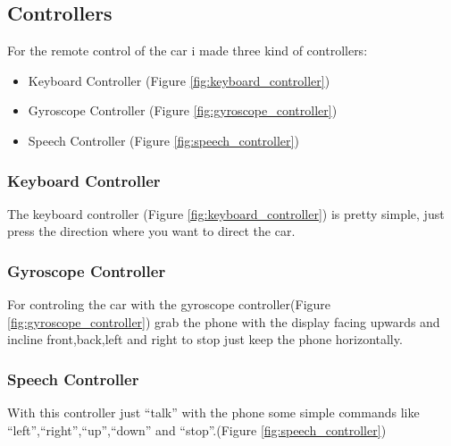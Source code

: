 \subsection{Controllers}
For the remote control of the car i made three kind of controllers:
\begin{itemize}
  \item Keyboard Controller (Figure \ref{fig:keyboard_controller})
  \item Gyroscope Controller (Figure \ref{fig:gyroscope_controller}) 
  \item Speech Controller (Figure \ref{fig:speech_controller})
\end{itemize}
\subsubsection{Keyboard Controller}
The keyboard controller (Figure \ref{fig:keyboard_controller}) is pretty simple, just press the direction where you want to direct the car.

\subsubsection{Gyroscope Controller}
For controling the car with the gyroscope controller(Figure \ref{fig:gyroscope_controller}) grab the phone with the display facing upwards and incline front,back,left and right to stop just keep the phone horizontally. 


\subsubsection{Speech Controller}
With this controller just ``talk''  with the phone some simple commands like ``left'',``right'',``up'',``down'' and ``stop''.(Figure \ref{fig:speech_controller})

